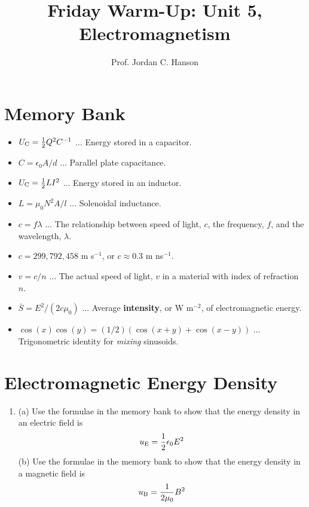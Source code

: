 \documentclass{article}
\begin{document}
\twocolumn

\title{Friday Warm-Up: Unit 5, Electromagnetism}
\author{Prof. Jordan C. Hanson}

\maketitle

\section{Memory Bank}

\begin{itemize}
\item $U_{\rm C} = \frac{1}{2}Q^2C^{-1}$ ... Energy stored in a capacitor.
\item $C = \epsilon_0 A/d$ ... Parallel plate capacitance.
\item $U_{\rm C} = \frac{1}{2}LI^2$ ... Energy stored in an inductor.
\item $L = \mu_0 N^2 A/l$ ... Solenoidal inductance.
\item $c = f\lambda$ ... The relationship between speed of light, $c$, the frequency, $f$, and the wavelength, $\lambda$.
\item $c = 299,792,458$ m s$^{-1}$, or $c \approx 0.3$ m ns$^{-1}$.
\item $v = c/n$ ... The actual speed of light, $v$ in a material with index of refraction $n$.
\item $\bar{S} = E^2/(2c\mu_0)$ ... Average \textbf{intensity}, or W m$^{-2}$, of electromagnetic energy.
\item $\cos(x)\cos(y) = (1/2)(\cos(x+y) + \cos(x-y))$ ... Trigonometric identity for \textit{mixing} sinusoids.
\end{itemize}

\section{Electromagnetic Energy Density}

\begin{enumerate}
\item (a) Use the formulae in the memory bank to show that the energy density in an electric field is
\begin{equation}
u_{\rm E} = \frac{1}{2}\epsilon_0 E^2
\end{equation}
(b) Use the formulae in the memory bank to show that the energy density in a magnetic field is
\begin{equation}
u_{\rm B} = \frac{1}{2\mu_0}B^2
\end{equation} \\ \vspace{2cm}
\end{enumerate}
\end{document}

